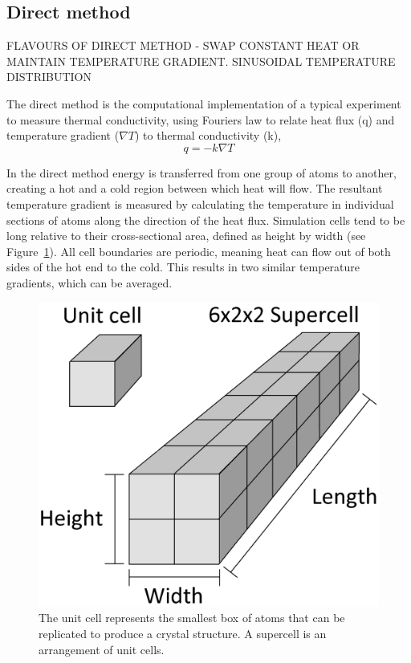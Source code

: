 \documentclass[%
preprint,                                  %
nofootinbib,
 amsmath,amssymb,
 aps,
]{revtex4-1}
\begin{document}
\subsection{\label{sec:method.direct}Direct method}

FLAVOURS OF DIRECT METHOD - SWAP CONSTANT HEAT OR MAINTAIN TEMPERATURE GRADIENT. SINUSOIDAL TEMPERATURE DISTRIBUTION

The direct method is the computational implementation of a typical experiment to measure thermal conductivity, using Fourier\textsc{}s law to relate heat flux (q) and temperature gradient ($\nabla{T}$) to thermal conductivity (k), 
\begin{equation}
q=-k \nabla{T} \label{fourier}
\end{equation}

In the direct method energy is transferred from one group of atoms to another, creating a hot and a cold region between which heat will flow. The resultant temperature gradient is measured by calculating the temperature in individual sections of atoms along the direction of the heat flux. Simulation cells tend to be long relative to their cross-sectional area, defined as height by width (see Figure~\ref{fig:cell_dia}). All cell boundaries are periodic, meaning heat can flow out of both sides of the hot end to the cold. This results in two similar temperature gradients, which can be averaged.

\begin{figure}[h]
  \includegraphics[width=\linewidth]{images/cell_diagram.png}
  \caption{The unit cell represents the smallest box of atoms that can be replicated to produce a crystal structure. A supercell is an arrangement of unit cells.} %
\label{fig:cell_dia}
\end{figure}
\end{document}
